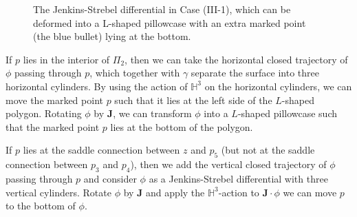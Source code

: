\documentclass[11pt]{amsart}
\theoremstyle{plain}
\newcommand{\rot}{\mathbf{J}}
\begin{document}
\begin{figure}[h]
    \centering
   \caption{The Jenkins-Strebel differential in Case (III-1), which can be deformed into a L-shaped pillowcase with an extra marked point (the blue bullet) lying at the bottom.}
   \label{fig:III-2}
\end{figure}


If $p$ lies in the interior of $\Pi_2$, then we can take the  horizontal closed trajectory of $\phi$
passing through $p$, which together with $\gamma$ separate the surface into three horizontal cylinders. By using the 
action of $\mathbb{H}^3$ on the horizontal cylinders, we can move the marked point $p$ such that it lies at the left side of the $L$-shaped polygon. Rotating $\phi$ by $\rot$, we can transform $\phi$ into a $L$-shaped pillowcase such that the marked point $p$ lies at the bottom of the polygon.

If $p$ lies at the saddle connection between $z$ and $p_5$ (but not at the saddle connection between $p_3$ and $p_4$), then we add the  vertical closed trajectory of $\phi$
passing through $p$ and consider $\phi$ as a Jenkins-Strebel differential with three vertical cylinders. Rotate $\phi$ by $\rot$ and apply the $\mathbb{H}^3$-action to $\rot \cdot \phi$
we can move $p$ to the bottom of $\phi$. 
\end{document}
